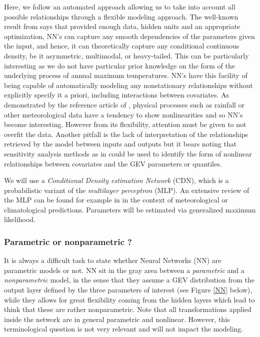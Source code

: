 Here, we follow an automated approach allowing us to take into account all possible relationships through a flexible modeling approach.
The well-known result from \cite{Hornik_1989} says that provided enough data, hidden units and an appropriate optimization, NN's can capture any smooth dependencies of the parameters given the input, and hence, it can theoretically capture any conditional continuous density, be it asymmetric, multimodal, or heavy-tailed. This can be particularly interesting as we do not have particular prior knowledge on the form of the underlying process of annual maximum temperatures. 
NN's have this facility of being capable of automatically modeling any nonstationary relationships without explicitly specify it a priori, including interactions between covariates. As demonstrated by the reference article of \citet{cannon_flexible_2010}, physical processes such as rainfall or other meteorological data have a tendency to show nonlinearities and so NN's become interesting. However from its flexibility, attention must be given to not overfit the data.  Another pitfall is the lack of interpretation of the relationships retrieved by the model between inputs and outputs but it bears noting that sensitivity analysis methods as in \citet{cannon_graph_2002} could be used to identify the form of nonlinear relationships between covariates and the GEV parameters or quantiles.


We will use a \emph{Conditional Density estimation Network} (CDN), which is a probabilistic variant of the \emph{multilayer perceptron} (MLP). 
An extensive review of the MLP can be found for example in \citet{Hsieh_Tang_1998} in the context of meteorological or climatological predictions. Parameters will be estimated via generalized maximum likelihood. 



\subsubsection*{Parametric or nonparametric ?}
It is always a difficult task to state whether Neural Networks (NN) are parametric models or not. NN sit in the gray area between a \emph{parametric} and a \emph{nonparametric} model, in the sense that they assume a GEV distribution from the output layer defined by the three parameters of interest (see Figure \ref{NN} below), while they allows for great flexibility coming from the hidden layers which lead to think that these are rather nonparametric. 
Note that all transformations applied inside the network are in general parametric and nonlinear.
However, this terminological question is not very relevant and will not impact the modeling.

